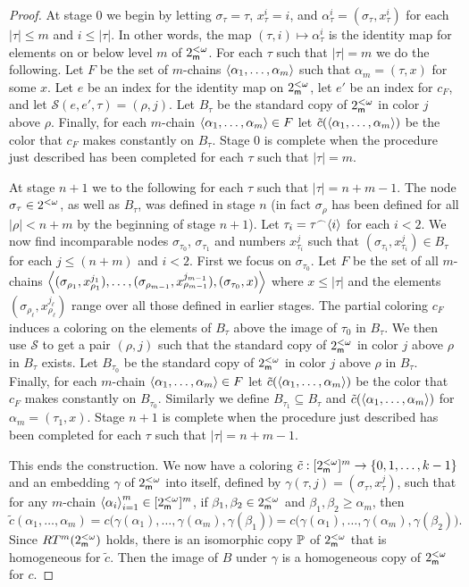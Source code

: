 \begin{proof}
At stage 0 we begin by letting $\sigma_{\tau}=\tau$,
$x_{\tau}^i=i$, and $\alpha^i_{\tau}=(\sigma_{\tau},x_{\tau}^i)$
for each $|\tau|\leq m$ and $i\leq|\tau|$.
In other words, the map $(\tau,i)\mapsto\alpha^i_\tau$
is the identity map for elements on or below level $m$ of $2^{<\omega}_{\mathsf{m}}$.
For each $\tau$ such that $|\tau|=m$ we do the following.
Let $F$ be the set of $m$-chains $\left\langle \alpha_1,\ldots,\alpha_m\right\rangle$ such that
$\alpha_m=(\tau,x)$ for some $x$.
Let $e$ be an index for the identity map on $2^{<\omega}_{\mathsf{m}}$,
let $e'$ be an index for $c_{F}$, and let $\mathcal{S}(e,e',\tau)=(\rho,j)$.
Let $B_{\tau}$ be the standard copy of $2^{<\omega}_{\mathsf{m}}$ in color $j$ above $\rho$.
Finally, for each $m$-chain $\left\langle \alpha_1,\ldots,\alpha_m\right\rangle\in F$
let $\tilde{c}(\left\langle \alpha_1,\ldots,\alpha_m\right\rangle)$ be the color that
$c_F$ makes constantly on $B_\tau$.
Stage 0 is complete when the procedure just described has been
completed for each $\tau$ such that $|\tau|=m$.

At stage $n+1$ we to the following for each $\tau$
such that $|\tau|=n+m-1$.
The node $\sigma_\tau\in2^{<\omega}$, as well as $B_\tau$,
was defined in stage $n$
(in fact $\sigma_\rho$ has been defined for all
$|\rho|<n+m$ by the beginning of stage $n+1$).
Let $\tau_i=\tau{}^\frown{\left\langle i\right\rangle}$ for each $i<2$.
We now find incomparable nodes $\sigma_{\tau_0}$, $\sigma_{\tau_1}$
and numbers $x^j_{\tau_i}$ such that
$(\sigma_{\tau_i},x^j_{\tau_i})\in B_{\tau}$
for each $j\leq (n+m)$ and $i<2$.
First we focus on $\sigma_{\tau_0}$.
Let $F$ be the set of all $m$-chains
$\left\langle (\sigma_{\rho_1},x^{j_1}_{\rho_1}),\ldots,(\sigma_{\rho_{m-1}},x^{j_{m-1}}_{\rho_{m-1}}),(\sigma_{\tau_0},x)\right\rangle$
where $x\leq|\tau|$ and the elements $(\sigma_{\rho_\ell},x^{j_\ell}_{\rho_\ell})$
range over all those defined in earlier stages.
The partial coloring $c_F$ induces a coloring on the elements
of $B_\tau$ above the image of $\tau_0$ in $B_\tau$.
We then use $\mathcal{S}$ to get a pair $(\rho,j)$
such that the standard copy of $2^{<\omega}_{\mathsf{m}}$ in color $j$ above $\rho$
in $B_\tau$ exists.
Let $B_{\tau_0}$ be the standard copy of $2^{<\omega}_{\mathsf{m}}$ in color $j$ above $\rho$ in $B_\tau$.
Finally, for each $m$-chain $\left\langle \alpha_1,\ldots,\alpha_m\right\rangle\in F$
let $\tilde{c}(\left\langle \alpha_1,\ldots,\alpha_m\right\rangle)$ be the color that
$c_F$ makes constantly on $B_{\tau_0}$.
Similarly we define $B_{\tau_1}\subseteq B_\tau$ and
$\tilde{c}(\left\langle \alpha_1,\ldots,\alpha_m\right\rangle)$ for $\alpha_m=(\tau_1,x)$.
Stage $n+1$ is complete when the procedure just described has been
completed for each $\tau$ such that $|\tau|=n+m-1$.

This ends the construction.
We now have a coloring $\tilde{c}:[2^{<\omega}_{\mathsf{m}}]^m\to\{0,1,\ldots,k-1\}$
and an embedding $\gamma$ of $2^{<\omega}_{\mathsf{m}}$ into itself,
defined by $\gamma(\tau,j)=(\sigma_\tau,x_\tau^j)$,
such that for any $m$-chain $\left\langle \alpha_i\right\rangle_{i=1}^m\in[2^{<\omega}_{\mathsf{m}}]^m$,
if $\beta_1,\beta_2\in2^{<\omega}_{\mathsf{m}}$ and $\beta_1,\beta_2\geq \alpha_m$, then
$$\tilde{c}(\alpha_1,\ldots,\alpha_m)=c\Big(\gamma(\alpha_1),\ldots,\gamma(\alpha_m),\gamma(\beta_1)\Big)=c\Big(\gamma(\alpha_1),\ldots,\gamma(\alpha_m),\gamma(\beta_2)\Big).$$
Since $RT^m(2^{<\omega}_{\mathsf{m}})$ holds, there is an isomorphic copy
$\mathbb{P}$ of $2^{<\omega}_{\mathsf{m}}$ that is homogeneous for $\tilde{c}$.
Then the image of $B$ under $\gamma$ is a homogeneous
copy of $2^{<\omega}_{\mathsf{m}}$ for $c$.
\end{proof}

